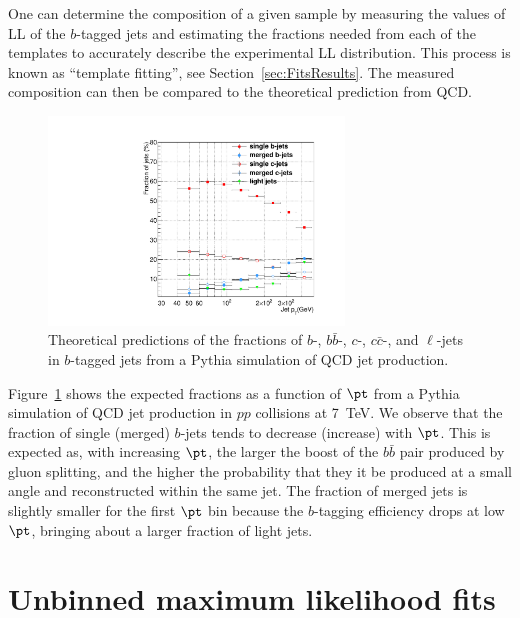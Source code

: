 One can determine the composition of a given sample by measuring the values of LL of the $b$-tagged jets and estimating the fractions needed from each of the templates to accurately describe the experimental LL distribution. This process is known as ``template fitting'', see Section~\ref{sec:FitsResults}. The measured composition can then be compared to the theoretical prediction from QCD. 
\begin{figure}[htb]
\centering
\includegraphics[width=0.70\textwidth]{TrueFractions_NominalPythia.pdf}
\caption{Theoretical predictions of the fractions of $b$-, $b\bar{b}$-, $c$-, $c\bar{c}$-, and $\ell$-jets in $b$-tagged jets from a {\sc Pythia} simulation of QCD jet production.}
\label{fig:truefractions}
\end{figure}
Figure~\ref{fig:truefractions} shows the expected fractions as a function of $\pt$ from a {\sc Pythia} simulation of QCD jet production in $pp$ collisions at 7~TeV. We observe that the fraction of single (merged) $b$-jets tends to decrease (increase) with $\pt$. This is expected as, with increasing $\pt$, the larger the boost of the $b\bar{b}$ pair produced by gluon splitting, and the higher the probability that they it be produced at a small angle and reconstructed within the same jet. The fraction of merged jets is slightly smaller for the first $\pt$ bin because the $b$-tagging efficiency drops at low $\pt$, bringing about a larger fraction of light jets. 


\section{Unbinned maximum likelihood fits}\label{sec:LLFits}

